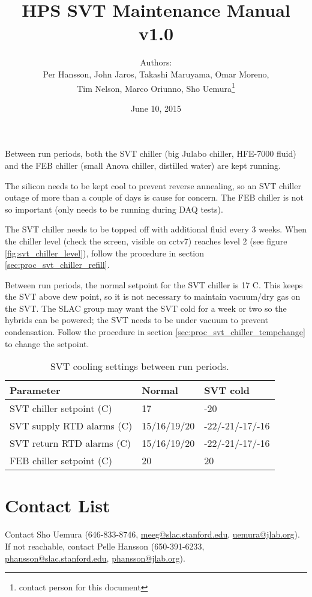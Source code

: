 \documentclass[12pt]{report}
\title{HPS SVT Maintenance Manual \\ v1.0}
\author{Authors: \\
Per Hansson, John Jaros, Takashi Maruyama, Omar Moreno,\\ Tim Nelson, Marco Oriunno, Sho Uemura\footnote{contact person for this document}}
\date{June 10, 2015} %
\begin{document}
\maketitle

Between run periods, both the SVT chiller (big Julabo chiller, HFE-7000 fluid) and the FEB chiller (small Anova chiller, distilled water) are kept running.

The silicon needs to be kept cool to prevent reverse annealing, so an SVT chiller outage of more than a couple of days is cause for concern. The FEB chiller is not so important (only needs to be running during DAQ tests).

The SVT chiller needs to be topped off with additional fluid every 3 weeks. When the chiller level (check the screen, visible on cctv7) reaches level 2 (see figure \ref{fig:svt_chiller_level}), follow the procedure in section \ref{sec:proc_svt_chiller_refill}.

Between run periods, the normal setpoint for the SVT chiller is 17 C. This keeps the SVT above dew point, so it is not necessary to maintain vacuum/dry gas on the SVT. 
The SLAC group may want the SVT cold for a week or two so the hybrids can be powered; the SVT needs to be under vacuum to prevent condensation. Follow the procedure in section \ref{sec:proc_svt_chiller_tempchange} to change the setpoint.

\begin{table}[h]
\begin{center}
\begin{tabular}{|l|l|l|}
\hline
Parameter & Normal & SVT cold \\
\hline
SVT chiller setpoint (C) & 17 & -20 \\
SVT supply RTD alarms (C) & 15/16/19/20 & -22/-21/-17/-16 \\
SVT return RTD alarms (C) & 15/16/19/20 & -22/-21/-17/-16 \\
FEB chiller setpoint (C) & 20 & 20 \\
\hline
\end{tabular}
\end{center}
\caption{SVT cooling settings between run periods.}
\end{table}

\section{Contact List}

Contact Sho Uemura (646-833-8746, {\url{meeg@slac.stanford.edu}, \url{uemura@jlab.org}}). If not reachable, contact Pelle Hansson (650-391-6233, \url{phansson@slac.stanford.edu}, \url{phansson@jlab.org}).
\end{document}
